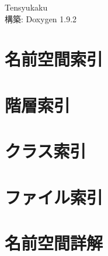\documentclass[twoside]{book}
\newcommand{\+}{\discretionary{\mbox{\scriptsize$\hookleftarrow$}}{}{}}
\newcommand{\clearemptydoublepage}{%
    \newpage{\pagestyle{empty}\cleardoublepage}%
  }
\begin{document}
  \raggedbottom
  \begin{CJK}{UTF8}{min}
    \hypersetup{pageanchor=false,
                bookmarksnumbered=true,
                pdfencoding=unicode
               }
  \begin{titlepage}
  \vspace*{7cm}
  \begin{center}%
  {\Large Tensyukaku}\\
  \vspace*{1cm}
  {\large 構築\+: Doxygen 1.9.2}\\
  \end{center}
  \end{titlepage}
  \clearemptydoublepage
  \tableofcontents
  \clearemptydoublepage
  \hypersetup{pageanchor=true}
\chapter{名前空間索引}

\chapter{階層索引}

\chapter{クラス索引}

\chapter{ファイル索引}

\chapter{名前空間詳解}







































\end{CJK}
\end{document}
